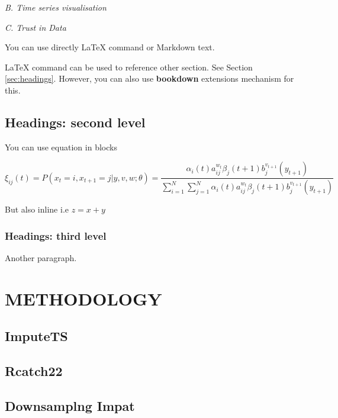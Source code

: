 \documentclass{article}
\begin{document}
\emph{B. Time series visualisation}

\emph{C. Trust in Data}

\onecolumn

You can use directly LaTeX command or Markdown text.

LaTeX command can be used to reference other section. See Section
\ref{sec:headings}. However, you can also use \textbf{bookdown}
extensions mechanism for this.

\hypertarget{headings-second-level}{%
\subsection{Headings: second level}\label{headings-second-level}}

You can use equation in blocks

\[
\xi _{ij}(t)=P(x_{t}=i,x_{t+1}=j|y,v,w;\theta)= {\frac {\alpha _{i}(t)a^{w_t}_{ij}\beta _{j}(t+1)b^{v_{t+1}}_{j}(y_{t+1})}{\sum _{i=1}^{N} \sum _{j=1}^{N} \alpha _{i}(t)a^{w_t}_{ij}\beta _{j}(t+1)b^{v_{t+1}}_{j}(y_{t+1})}}
\]

But also inline i.e \(z=x+y\)

\hypertarget{headings-third-level}{%
\subsubsection{Headings: third level}\label{headings-third-level}}

Another paragraph.

\hypertarget{methodology}{%
\section{METHODOLOGY}\label{methodology}}

\label{sec:headings}

\hypertarget{imputets}{%
\subsection{ImputeTS}\label{imputets}}

\hypertarget{rcatch22}{%
\subsection{Rcatch22}\label{rcatch22}}

\hypertarget{downsamplng-impat}{%
\subsection{Downsamplng Impat}\label{downsamplng-impat}}
\end{document}
